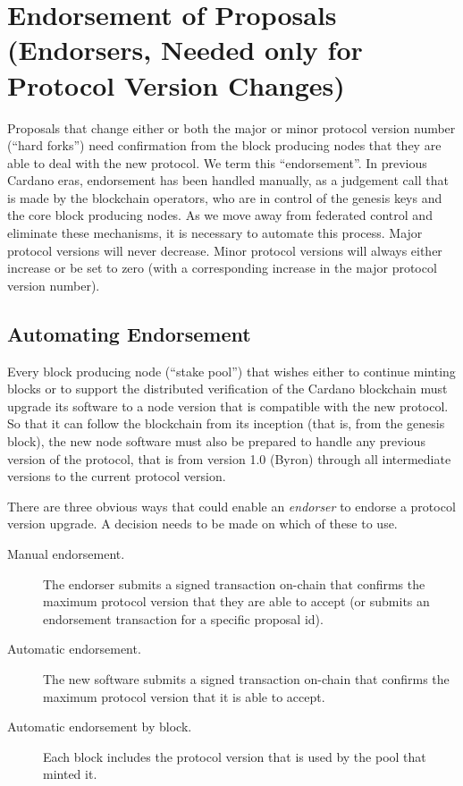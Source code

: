 \newpage
\section{Endorsement of Proposals (Endorsers, Needed only for Protocol Version Changes)}
\label{sect:endorsement}

Proposals that change either or both the major or minor protocol version number (``hard forks'') need confirmation from the block producing nodes that they are able
to deal with the new protocol.  We term this ``endorsement''.   In previous Cardano eras, endorsement has been handled manually, as a judgement call that
is made by the blockchain operators, who are in control of the genesis keys and the core block producing nodes.  As we move away from federated control and eliminate these
mechanisms, it is necessary to automate this process.  Major protocol versions will never decrease.  Minor protocol versions will always either increase or be set to zero
(with a corresponding increase in the major protocol version number).

\subsection{Automating Endorsement}

Every block producing node (``stake pool'') that wishes either to continue minting
blocks or to support the distributed verification of the Cardano blockchain must upgrade its
software to a node version that is compatible with the new protocol.  So that it
can follow the blockchain from its inception (that is, from the genesis block),
the new node software must also be prepared to handle any previous version of
the protocol, that is from version 1.0 (Byron) through all intermediate versions to the current protocol version.

There are three obvious ways that could enable an \emph{endorser} to endorse a protocol version upgrade.  A decision needs
to be made on which of these to use.

\begin{description}
\item
  [Manual endorsement.]  The endorser submits a signed transaction on-chain that confirms the maximum protocol version that they are
  able to accept (or submits an endorsement transaction for a specific proposal id).
\item
  [Automatic endorsement.]  The new software submits a signed transaction on-chain that confirms the maximum protocol version that it is
  able to accept.
\item
  [Automatic endorsement by block.]  Each block includes the protocol version that is used by the pool that minted it.
\end{description}

